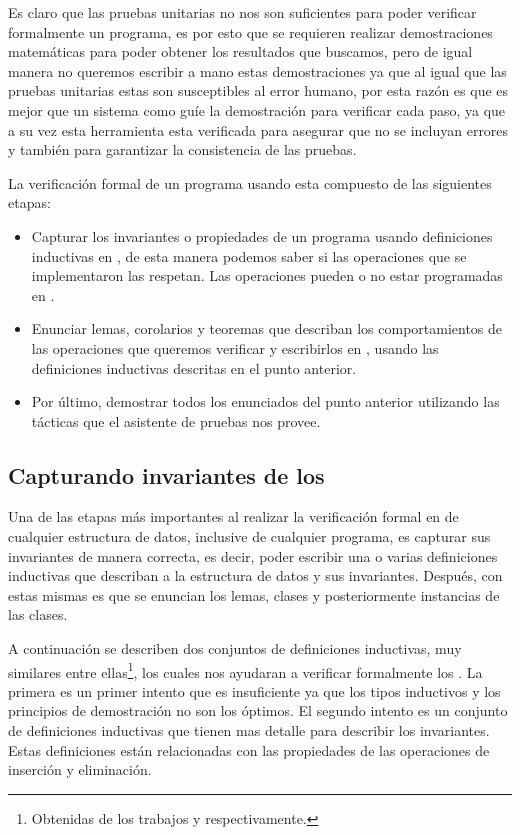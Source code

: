 Es claro que las pruebas unitarias no nos son suficientes para poder verificar formalmente un
programa, es por esto que se requieren realizar demostraciones matemáticas para poder obtener los
resultados que buscamos, pero de igual manera no queremos escribir a mano estas demostraciones ya
que al igual que las pruebas unitarias estas son susceptibles al error humano, por esta raz\'on es que es mejor que un sistema como {\coq} guíe la demostraci\'on para verificar cada paso, ya que a su vez esta herramienta esta verificada para asegurar que no se incluyan errores y también para garantizar la consistencia de las pruebas\cite{Geuvers2009}.

La verificaci\'on formal de un programa usando {\coq} esta compuesto de las siguientes etapas:
\begin{itemize}
    \item Capturar los invariantes o propiedades de un programa usando definiciones inductivas en {\coq}, de
    esta manera podemos saber si las operaciones que se implementaron las respetan. Las operaciones pueden o no estar programadas en {\coq}.
    \item Enunciar lemas, corolarios y teoremas que describan los comportamientos de las
    operaciones que queremos verificar y escribirlos en {\coq}, usando las definiciones inductivas
    descritas en el punto anterior.
    \item Por \'ultimo, demostrar todos los enunciados del punto anterior utilizando las t\'acticas
    que el asistente de pruebas nos provee.
\end{itemize}{}

\subsection{Capturando invariantes de los {\Arns}}
Una de las etapas m\'as importantes al realizar la verificaci\'on formal en {\coq} de cualquier estructura de
datos, inclusive de cualquier programa, es capturar sus invariantes de manera correcta, es decir,
poder escribir una o varias definiciones inductivas que describan a la estructura de datos y sus
invariantes. Después, con estas mismas es que se enuncian los lemas, clases y posteriormente
instancias de las clases.

A continuaci\'on se describen dos conjuntos de definiciones inductivas, muy similares entre ellas\footnote{Obtenidas de los trabajos \cite{tesisG} y \cite{MSetRBT} respectivamente.},
los cuales nos ayudaran a verificar formalmente los {\arns}. La primera es un primer intento que es
insuficiente ya que los tipos inductivos y los principios de demostraci\'on no son los \'optimos.
El segundo intento es un conjunto de definiciones inductivas que tienen mas detalle para describir
los invariantes. Estas definiciones est\'an relacionadas con las propiedades de las operaciones de
inserci\'on y eliminaci\'on.

